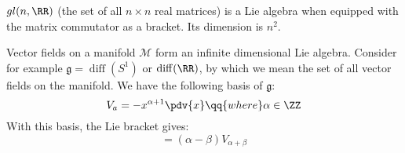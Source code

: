 \documentclass{jknotes}
\begin{document}
\begin{eg}
    \(gl(n,\RR)\) (the set of all \(n\times n\) real matrices) is a Lie algebra when equipped with the matrix commutator as a bracket. Its dimension is \(n^2\).
\end{eg}
\begin{eg}
    Vector fields on a manifold \(\mathcal{M}\) form an infinite dimensional Lie algebra. Consider for example \(\mathfrak{g} = \operatorname{diff}(S^1)\) or \(\operatorname{diff}(\RR)\), by which we mean the set of all vector fields on the manifold. We have the following basis of \(\mathfrak{g}\):
    \begin{equation}
        V_a = - x^{\alpha+1}\pdv{x} \qq{where} \alpha\in\ZZ
    \end{equation}
    With this basis, the Lie bracket gives:
    \begin{equation}
        [V_\alpha,V_\beta] = (\alpha-\beta)V_{\alpha+\beta}
    \end{equation}
\end{eg}
\end{document}
